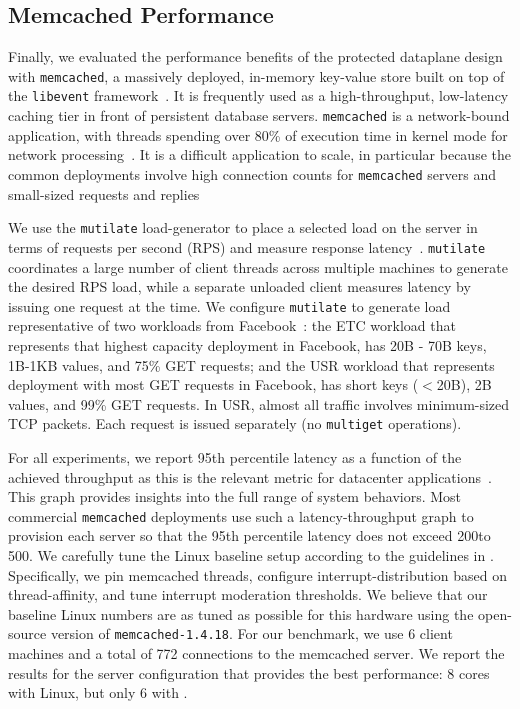 
\subsection{Memcached Performance}
\label{sec:eval:memcached}




Finally, we evaluated the performance benefits of the \ix protected
dataplane design with \texttt{memcached}, a massively deployed,
in-memory key-value store built on top of the \texttt{libevent}
framework~\cite{url:memcached}. It is frequently used as a
high-throughput, low-latency caching tier in front of persistent
database servers. \texttt{memcached} is a network-bound application,
with threads spending over 80\% of execution time in kernel mode for
network processing~\cite{Leverich:RHSU:2014}. It is a difficult
application to scale, in particular because the common deployments
involve high connection counts for \texttt{memcached} servers and
small-sized requests and
replies~\cite{nishtala2013scaling,Atikoglu:2012:WAL}

We use the \texttt{mutilate} load-generator to place a selected load
on the server in terms of requests per second (RPS) and measure
response latency~\cite{url:mutilate}. \texttt{mutilate} coordinates a
large number of client threads across multiple machines to generate
the desired RPS load, while a separate unloaded client measures
latency by issuing one request at the time.  We configure
\texttt{mutilate} to generate load representative of two workloads
from Facebook~\cite{Atikoglu:2012:WAL}: the ETC workload that
represents that highest capacity deployment in Facebook, has 20B - 70B
keys, 1B-1KB values, and 75\% GET requests; and the USR workload that
represents deployment with most GET requests in Facebook, has short
keys ($<$20B), 2B values, and 99\% GET requests. In USR, almost all
traffic involves minimum-sized TCP packets. Each request is issued
separately (no \texttt{multiget} operations).

  For all experiments, we report 95th percentile latency as
a function of the achieved throughput as this is the relevant metric
for datacenter applications~\cite{DBLP:journals/cacm/DeanB13}. This
graph provides insights into the full range of system behaviors. Most
commercial \texttt{memcached} deployments use such a
latency-throughput graph to provision each server so that the 95th
percentile latency does not exceed 200\microsecond to 500\microsecond.
We carefully tune the Linux baseline setup according to the guidelines
in \cite{Leverich:RHSU:2014}. Specifically, we pin memcached threads,
configure interrupt-distribution based on thread-affinity, and tune
interrupt moderation thresholds. We believe that our baseline Linux
numbers are as tuned as possible for this hardware using the
open-source version of \texttt{memcached-1.4.18}. For our benchmark,
we use 6 client machines and a total of 772 connections to the
memcached server.  We report the results for the server configuration
that provides the best performance: 8 cores with Linux, but only 6
with \ix.

